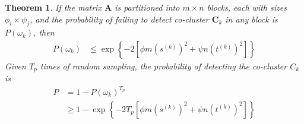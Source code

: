 \documentclass[letterpaper, 10 pt, conference]{ieeeconf}  %
\newtheorem{theorem}{Theorem}
\begin{document}

\appendix

\begin{theorem}
    \label{thm:probability_co_cluster_detection}
    If the matrix $\mathbf{A}$ is partitioned into $m \times n$ blocks, each with sizes $\phi_i \times \psi_j$, and the probability of failing to detect co-cluster $\mathbf{C}_k$ in any block is $P(\omega_k)$, then
    \begin{equation}
        \begin{split}
            P(\omega_k) & \le \exp \left\{ -2 [\phi m (s^{(k)})^2 + \psi n (t^{(k)})^2] \right\}
        \end{split}
    \end{equation}
    Given $T_p$ times of random sampling, the probability of detecting the co-cluster $C_k$ is
    \begin{equation}
        \begin{split}
            P & = 1 - P(\omega_k)^{T_p}                                                        \\
              & \ge 1 - \exp \left\{ -2 T_p [\phi m (s^{(k)})^2 + \psi n (t^{(k)})^2] \right\}
        \end{split}
    \end{equation}

\end{theorem}
\end{document}
